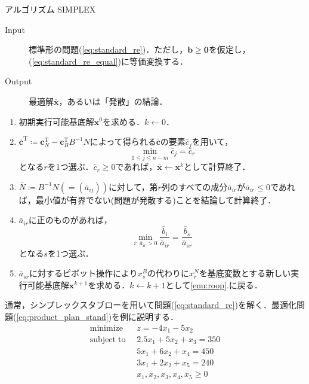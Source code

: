\documentclass{jsreport}
\begin{document}
\begin{itembox}[l]{アルゴリズム SIMPLEX}
  \begin{description}
    \item[Input] 標準形の問題(\ref{eq:standard_re})．ただし，$\bm{b} \geq \bm{0}$を仮定し，(\ref{eq:standard_re_equal})に等価変換する．
    \item[Output] 最適解$\bar{\bm{x}}$，あるいは「発散」の結論．
  \end{description}
  \begin{enumerate}
    \item 初期実行可能基底解$\bm{x}^{0}$を求める．$k \leftarrow 0$．
    \item $\bar{\bm{c}}^{\mathrm{T}} \coloneqq \bm{c}_N^{\mathrm{T}} - \bm{c}_B^{\mathrm{T}}B^{-1}N$によって得られる$\bar{\bm{c}}$の要素$\bar{c}_j$を用いて，
    \begin{equation}
      \min_{1 \leq j \leq n - m} \bar{c}_j = \bar{c}_r \nonumber
    \end{equation}
    となる$r$を1つ選ぶ．$\bar{c}_r \geq 0$であれば，$\bar{\bm{x}} \leftarrow \bm{x}^k$として計算終了．\label{enu:roop}
    \item $\bar{N} \coloneqq B^{-1}N (=(\bar{a}_{ij}))$に対して，第$r$列のすべての成分$\bar{a}_{ir}$が$\bar{a}_{ir} \leq 0$であれば，最小値が有界でない(問題が発散する)ことを結論して計算終了．
    \item $\bar{a}_{ir}$に正のものがあれば，
    \begin{equation}
      \min_{i: \, \bar{a}_{ir} > 0} \frac{\bar{b}_i}{\bar{a}_{ir}} = \frac{\bar{b}_s}{\bar{a}_{sr}} \nonumber
    \end{equation}
    となる$s$を1つ選ぶ．
    \item $\bar{a}_{sr}$に対するピボット操作により$x_s^B$の代わりに$x_r^N$を基底変数とする新しい実行可能基底解$\bm{x}^{k + 1}$を求める．$k \leftarrow k + 1$として\ref{enu:roop}.に戻る．
  \end{enumerate}
\end{itembox}
通常，シンプレックスタブローを用いて問題(\ref{eq:standard_re})を解く．最適化問題(\ref{eq:product_plan_stand})を例に説明する．
\begin{align}
  \mathrm{minimize} \; \; &z = -4x_1 - 5x_2 \nonumber \\
  \mathrm{subject \; to} \; \; &2.5x_1 + 5x_2 + x_3 = 350 \nonumber \\
  &5x_1 + 6x_2 + x_4 = 450 \nonumber \\
  &3x_1 + 2x_2 + x_5 = 240 \nonumber \\
  &x_1, x_2, x_3, x_4, x_5 \geq 0 \nonumber
\end{align}
\end{document}
